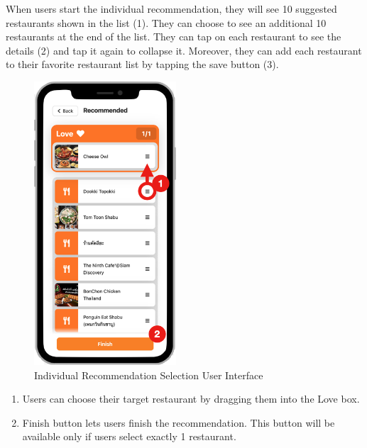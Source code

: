 \documentclass[12pt,oneside,openright,a4paper]{cpe-english-project}
\begin{document}
When users start the individual recommendation, they will see 10 suggested restaurants shown in the list (1). They can choose to see an additional 10 restaurants at the end of the list. They can tap on each restaurant to see the details (2) and tap it again to collapse it. Moreover, they can add each restaurant to their favorite restaurant list by tapping the save button (3).
\begin{figure}[H]\centering
\includegraphics[height=300pt]{./images/4ui_IndividualRecommendationSelectionUserInterface.png}
\caption{Individual Recommendation Selection User Interface}\label{fig:4ui_IndividualRecommendationSelectionUserInterface}
\end{figure}

\begin{enumerate}
\item Users can choose their target restaurant by dragging them into the Love box.
\item Finish button lets users finish the recommendation. This button will be available only if users select exactly 1 restaurant.
\end{enumerate}
\end{document}
